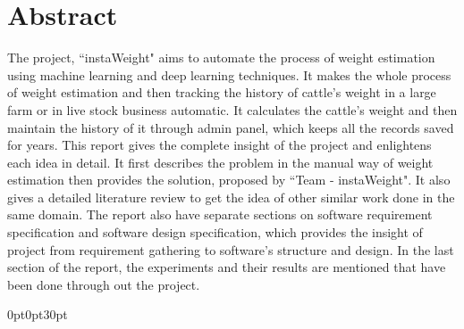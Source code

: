 \documentclass[12pt,twosided]{report}
\begin{document}
\chapter*{Abstract}
The project, ``instaWeight" aims to automate the process of weight estimation using machine learning and deep learning techniques. It makes the whole process of weight estimation and then tracking the history of cattle's weight in a large farm or in live stock business automatic. It calculates the cattle's weight and then maintain the history of it through admin panel, which keeps all the records saved for years. 
\newline
This report gives the complete insight of the project and enlightens each idea in detail. It first describes the problem in the manual way of weight estimation then provides the solution, proposed by ``Team - instaWeight". It also gives a detailed literature review to get the idea of other similar work done in the same domain. The report also have separate sections on software requirement specification and software design specification, which provides the insight of project from requirement gathering to software's structure and design. 
In the last section of the report, the experiments and their results are mentioned that have been done through out the project. 
\tableofcontents
\listoffigures




\titleformat{\chapter}[display]
{\normalfont\bfseries\filcenter}{\MakeUppercase\chaptertitlename\ \thechapter}{0pt}{\MakeUppercase }  %
\titlespacing*{\chapter}
  {0pt}{0pt}{30pt}	%
  
\end{document}

